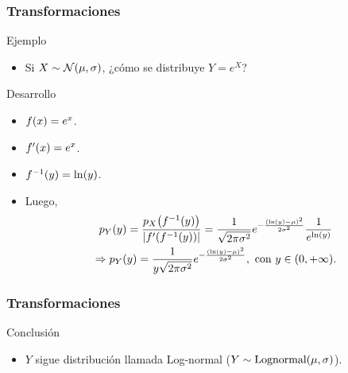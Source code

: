 \documentclass[table]{beamer}
\begin{document}
\begin{frame}
    \frametitle{Transformaciones}
    \begin{exampleblock}{Ejemplo}
        \begin{itemize}
            \item Si $X \sim \normal{\mu}{\sigma}$, ¿cómo se distribuye $Y = e^{X}$?
        \end{itemize}
    \end{exampleblock}
    \begin{block}{Desarrollo}
        \begin{itemize}
            \item $\ff{x} = e^{x}$.
            \item $f' \parens{x} = e^{x}$.
            \item $f^{-1} \parens{y} = \ln \parens{y}$.
            \item Luego,
                \begin{multline*}
                    \ppdf{Y}{y}
                    = \frac{\ppdf{X}{f^{-1} \parens{y}}}{\vparens{f' \parens{f^{-1} \parens{y}}}}
                    = \frac{1}{\sqrt{2 \pi \sigma^{2}}} e^{- \frac{\parens{\ln \parens{y} - \mu}^{2}}{2 \sigma^{2}}} \frac{1}{e^{\ln \parens{y}}}
                    \\
                    \Rightarrow
                    \ppdf{Y}{y}
                    = \frac{1}{y \sqrt{2 \pi \sigma^{2}}} e^{- \frac{\parens{\ln \parens{y} - \mu}^{2}}{2 \sigma^{2}}} , \text{ con } y \in \parens{0, + \infty} .
                \end{multline*}
        \end{itemize}
    \end{block}
    
\end{frame}

\begin{frame}
    \frametitle{Transformaciones}
       \begin{block}{Conclusión}
        \begin{itemize}
            \item $Y$ sigue distribución llamada Log-normal ($Y \sim \text{Lognormal} \parens{\mu, \sigma}$).
        \end{itemize}
    \end{block}
\end{frame}
\end{document}
